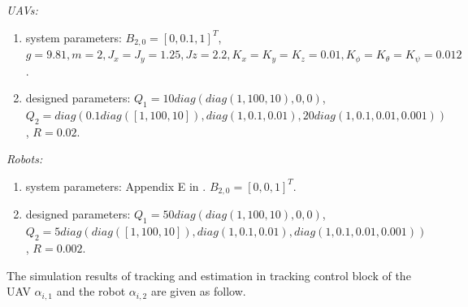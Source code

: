 \documentclass{ieeeaccess}
\begin{document}
\textit{UAVs:}\begin{enumerate}
    \item system parameters:
    $B_{2,0} = [0, 0.1, 1]^T$,
    $g = 9.81, m = 2,
    J_x = J_y = 1.25, Jz = 2.2,
    K_x = K_y = K_z = 0.01,
    K_\phi = K_\theta = K_\psi = 0.012$.
    \item designed parameters: 
    $Q_1 = 10diag(diag(1,100,10)\mathbin{,} 0\mathbin{,} 0)$, 
    $Q_2 = diag(0.1diag([1\mathbin{,} 100\mathbin{,} 10]), diag(1,0.1\mathbin{,} 0.01), 20diag(1,0.1,0.01 ,0.001))$, 
    $R = 0.02$.
\end{enumerate}

\textit{Robots:} \begin{enumerate}
    \item system parameters: Appendix E in \cite{ourrobot}. $B_{2,0} = [0, 0, 1]^T$.
    \item designed parameters:
    $Q_1 = 50diag(diag(1,100,10)\mathbin{,} 0\mathbin{,} 0)$, 
    $Q_2 = 5diag(diag([1\mathbin{,} 100\mathbin{,} 10]), diag(1,0.1\mathbin{,}0.01)\mathbin{,} diag(1,0.1,0.01,0.001))$, 
    $R = 0.002$.
\end{enumerate}

The simulation results of tracking and estimation in tracking control block of the UAV $\alpha_{i,1}$ and the robot $\alpha_{i,2}$ are given as follow.
\end{document}
